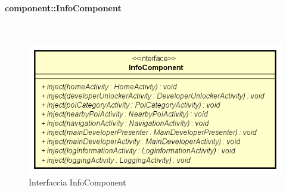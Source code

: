 \documentclass[../DefinizioneDiProdotto.tex]{subfiles}
\begin{document}
\paragraph{component::InfoComponent}
\
\begin{figure}[H]
	\centering
	\includegraphics[width=\maxwidth]{img/InfoComponent.png}
	\caption{Interfaccia InfoComponent}\label{fig:component::InfoComponent} 
\end{figure}
\end{document}
